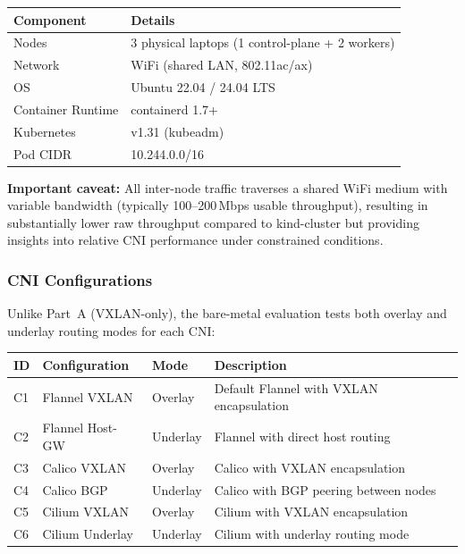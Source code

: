 \documentclass[11pt,a4paper]{article}
\begin{document}
\begin{infobox}
\begin{tabularx}{\textwidth}{lX}
  \toprule
  \textbf{Component} & \textbf{Details} \\
  \midrule
  Nodes & 3 physical laptops (1 control-plane + 2 workers) \\
  Network & WiFi (shared LAN, 802.11ac/ax) \\
  OS & Ubuntu 22.04 / 24.04 LTS \\
  Container Runtime & containerd 1.7+ \\
  Kubernetes & v1.31 (kubeadm) \\
  Pod CIDR & 10.244.0.0/16 \\
  \bottomrule
\end{tabularx}
\end{infobox}

\noindent\textbf{Important caveat:} All inter-node traffic traverses a shared WiFi medium with variable bandwidth (typically 100--200\,Mbps usable throughput), resulting in substantially lower raw throughput compared to kind-cluster but providing insights into relative CNI performance under constrained conditions.

\subsubsection{CNI Configurations}

Unlike Part~A (VXLAN-only), the bare-metal evaluation tests both overlay and underlay routing modes for each CNI:

\begin{longtable}{p{1.2cm}p{3.5cm}p{2.5cm}p{5.5cm}}
  \toprule
  \textbf{ID} & \textbf{Configuration} & \textbf{Mode} & \textbf{Description} \\
  \midrule
  C1 & Flannel VXLAN & Overlay & Default Flannel with VXLAN encapsulation \\
  C2 & Flannel Host-GW & Underlay & Flannel with direct host routing \\
  C3 & Calico VXLAN & Overlay & Calico with VXLAN encapsulation \\
  C4 & Calico BGP & Underlay & Calico with BGP peering between nodes \\
  C5 & Cilium VXLAN & Overlay & Cilium with VXLAN encapsulation \\
  C6 & Cilium Underlay & Underlay & Cilium with underlay routing mode \\
  \bottomrule
\end{longtable}
\end{document}
